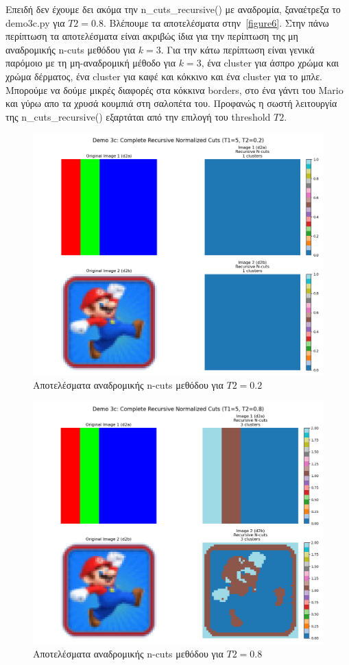\documentclass{article}
\begin{document}
Επειδή δεν έχουμε δει ακόμα την n\_cuts\_recursive() με αναδρομία, ξαναέτρεξα το
demo3c.py για $T2=0.8$. Βλέπουμε τα αποτελέσματα στην~\autoref{figure6}. Στην 
πάνω περίπτωση τα αποτελέσματα είναι ακριβώς ίδια για την περίπτωση της 
μη αναδρομικής n-cuts μεθόδου για $k=3$. Για την κάτω περίπτωση είναι 
γενικά παρόμοιο με τη μη-αναδρομική μέθοδο για $k=3$, 
ένα cluster για άσπρο χρώμα και χρώμα δέρματος, ένα cluster 
για καφέ και κόκκινο και ένα cluster για το μπλε. Μπορούμε να
δούμε μικρές διαφορές στα κόκκινα borders, στο ένα γάντι του Mario
και γύρω απο τα χρυσά κουμπιά στη σαλοπέτα του. Προφανώς η σωστή 
λειτουργία της n\_cuts\_recursive() εξαρτάται από την επιλογή 
του threshold $T2$. 

\begin{figure}
    \centering
    \includegraphics[width=\linewidth]{Figure_5.png}
    \caption{Αποτελέσματα αναδρομικής n-cuts μεθόδου για $T2=0.2$}\label{figure5}
\end{figure}


\begin{figure}
    \centering
    \includegraphics[width=\linewidth]{Figure_6.png}
    \caption{Αποτελέσματα αναδρομικής n-cuts μεθόδου για $T2=0.8$}\label{figure6}
\end{figure}
\end{document}
